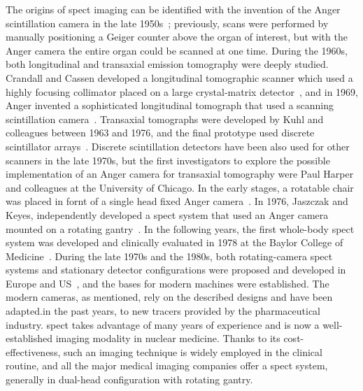 The origins of \gls{spect} imaging can be identified with the invention of the Anger scintillation camera in the late 1950s~\parencite{Anger1958, Anger1964}; previously, scans were performed by manually positioning a Geiger counter above the organ of interest, but with the Anger camera the entire organ could be scanned at one time. During the 1960s, both longitudinal and transaxial emission tomography were deeply studied. Crandall and Cassen developed a longitudinal tomographic scanner which used a highly focusing collimator placed on a large crystal-matrix detector~\parencite{Crandall1966}, and in 1969, Anger invented a sophisticated longitudinal tomograph that used a scanning scintillation camera~\parencite{Anger1969}. Transaxial tomographs were developed by Kuhl and colleagues between 1963 and 1976, and the final prototype used discrete scintillator arrays~\parencite{Kuhl1976}. Discrete scintillation detectors have been also used for other scanners in the late 1970s, but the first investigators to explore the possible implementation of an Anger camera for transaxial tomography were Paul Harper and colleagues at the University of Chicago. In the early stages, a rotatable chair was placed in fornt of a single head fixed Anger camera~\parencite{Muehllehner1971}. In 1976, Jaszczak and Keyes, independently developed a \gls{spect} system that used an Anger camera mounted on a rotating gantry~\parencite{Jaszczak1977, Keyes1977}. In the following years, the first whole-body \gls{spect} system was developed and clinically evaluated in 1978 at the Baylor College of Medicine~\parencite{Jaszczak1979}. During the late 1970s and the 1980s, both rotating-camera \gls{spect} systems and stationary detector configurations were proposed and developed in Europe and US~\parencite{Larsson1980, Rogers1988}, and the bases for modern machines were established. 
The modern cameras, as mentioned, rely on the described designs and have been adapted.in the past years, to new tracers provided by the pharmaceutical industry. \gls{spect} takes advantage of many years of experience and is now a well-established imaging modality in nuclear medicine. Thanks to its cost-effectiveness, such an imaging technique is widely employed in the clinical routine, and all the major medical imaging companies offer a \gls{spect} system, generally in dual-head configuration with rotating gantry.
